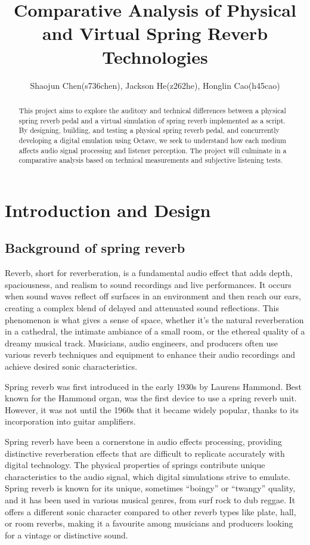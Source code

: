 \documentclass[12pt]{article}
\title{Comparative Analysis of Physical and Virtual Spring Reverb Technologies}
\author{
    Shaojun Chen(s736chen), Jackson He(z262he), Honglin Cao(h45cao) \\
}
\date{\displaydate{date}}
\begin{document}
\maketitle

\begin{abstract}
This project aims to explore the auditory and technical differences between a physical spring reverb pedal and a virtual simulation of spring reverb implemented as a script. By designing, building, and testing a physical spring reverb pedal, and concurrently developing a digital emulation using Octave, we seek to understand how each medium affects audio signal processing and listener perception. The project will culminate in a comparative analysis based on technical measurements and subjective listening tests.
\end{abstract}

\tableofcontents
\newpage

\section{Introduction and Design}
\subsection{Background of spring reverb}

Reverb, short for reverberation, is a fundamental audio effect that adds depth, spaciousness, and realism to sound recordings and live performances. It occurs when sound waves reflect off surfaces in an environment and then reach our ears, creating a complex blend of delayed and attenuated sound reflections. This phenomenon is what gives a sense of space, whether it's the natural reverberation in a cathedral, the intimate ambiance of a small room, or the ethereal quality of a dreamy musical track. Musicians, audio engineers, and producers often use various reverb techniques and equipment to enhance their audio recordings and achieve desired sonic characteristics.

Spring reverb was first introduced in the early 1930s by Laurens Hammond. Best known for the Hammond organ, was the first device to use a spring reverb unit. However, it was not until the 1960s that it became widely popular, thanks to its incorporation into guitar amplifiers.

Spring reverb have been a cornerstone in audio effects processing, providing distinctive reverberation effects that are difficult to replicate accurately with digital technology. The physical properties of springs contribute unique characteristics to the audio signal, which digital simulations strive to emulate.
Spring reverb is known for its unique, sometimes ``boingy'' or ``twangy'' quality, and it has been used in various musical genres, from surf rock to dub reggae. It offers a different sonic character compared to other reverb types like plate, hall, or room reverbs, making it a favourite among musicians and producers looking for a vintage or distinctive sound.
\end{document}
